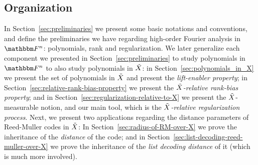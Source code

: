 \subsection{Organization}\label{subsec:organization}
In Section~\ref{sec:preliminaries} we present some basic notations and conventions,
and define the preliminaries we have regarding high-order Fourier analysis in $\field$: polynomials, rank and regularization.
We later generalize each component we presented in Section~\ref{sec:preliminaries} to study polynomials in $\field$ to also study polynomials in ${\tilde{X}}$:
in Section~\ref{sec:polynomials_in_X} we present the set of polynomials in ${\tilde{X}}$ and present the \emph{lift-enabler property};
in Section~\ref{sec:relative-rank-bias-property} we present the \emph{${\tilde{X}}$-relative rank-bias property};
and in Section~\ref{sec:regularization-relative-to-X} we present the ${\tilde{X}}$-measurable notion, and our main tool, which is the \emph{${\tilde{X}}$-relative regularization process}.
Next, we present two applications regarding the distance parameters of Reed-Muller codes in ${\tilde{X}}$:
In Section~\ref{sec:radius-of-RM-over-X} we prove the inheritance of the \emph{distance} of the code;
and in Section~\ref{sec:list-decoding-reed-muller-over-X} we prove the inheritance of the \emph{list decoding distance} of it (which is much more involved).


